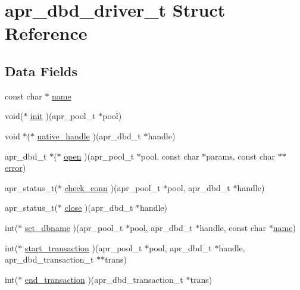 \hypertarget{structapr__dbd__driver__t}{\section{apr\-\_\-dbd\-\_\-driver\-\_\-t Struct Reference}
\label{structapr__dbd__driver__t}
}
\subsection*{Data Fields}
\begin{DoxyCompactItemize}
\item 
const char $\ast$ \hyperlink{structapr__dbd__driver__t_a5483b4c47dde6814395bebfb7959fb37}{name}
\item 
void($\ast$ \hyperlink{structapr__dbd__driver__t_aee4cda10b8f3c7680d3f8fe9d9835d6e}{init} )(apr\-\_\-pool\-\_\-t $\ast$pool)
\item 
void $\ast$($\ast$ \hyperlink{structapr__dbd__driver__t_a435f098bde2b17e3b156ef33d0c9c37e}{native\-\_\-handle} )(apr\-\_\-dbd\-\_\-t $\ast$handle)
\item 
apr\-\_\-dbd\-\_\-t $\ast$($\ast$ \hyperlink{structapr__dbd__driver__t_a911ce972cd9c1dbbcf770aed475e6428}{open} )(apr\-\_\-pool\-\_\-t $\ast$pool, const char $\ast$params, const char $\ast$$\ast$\hyperlink{structapr__dbd__driver__t_a0f43ae627fef47fb6eb2d5a6bca07c65}{error})
\item 
apr\-\_\-status\-\_\-t($\ast$ \hyperlink{structapr__dbd__driver__t_a93567b4557c0bf19c3ce104fb4636f46}{check\-\_\-conn} )(apr\-\_\-pool\-\_\-t $\ast$pool, apr\-\_\-dbd\-\_\-t $\ast$handle)
\item 
apr\-\_\-status\-\_\-t($\ast$ \hyperlink{structapr__dbd__driver__t_aef39417149ae8af2738bd8aaa92bcb42}{close} )(apr\-\_\-dbd\-\_\-t $\ast$handle)
\item 
int($\ast$ \hyperlink{structapr__dbd__driver__t_a5ec15b2e1c4f2cee690d09c14fef689b}{set\-\_\-dbname} )(apr\-\_\-pool\-\_\-t $\ast$pool, apr\-\_\-dbd\-\_\-t $\ast$handle, const char $\ast$\hyperlink{structapr__dbd__driver__t_a5483b4c47dde6814395bebfb7959fb37}{name})
\item 
int($\ast$ \hyperlink{structapr__dbd__driver__t_ad1a4117f436e9fb54e75922a0b21541e}{start\-\_\-transaction} )(apr\-\_\-pool\-\_\-t $\ast$pool, apr\-\_\-dbd\-\_\-t $\ast$handle, apr\-\_\-dbd\-\_\-transaction\-\_\-t $\ast$$\ast$trans)
\item 
int($\ast$ \hyperlink{structapr__dbd__driver__t_a8bb760ec3ffb8c0ff8514a7133cf8cb3}{end\-\_\-transaction} )(apr\-\_\-dbd\-\_\-transaction\-\_\-t $\ast$trans)

\end{DoxyCompactItemize}
